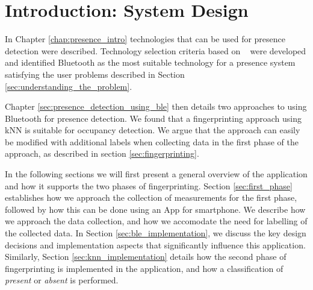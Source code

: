\section{Introduction: System Design}
In Chapter \ref{chap:presence_intro} technologies that can be used for presence detection were described. 
Technology selection criteria based on \citeauthor{presence_ble_review}~\cite{presence_ble_review} were developed and identified Bluetooth as the most suitable technology for a presence system satisfying the user problems described in Section \ref{sec:understanding_the_problem}.

Chapter \ref{sec:presence_detection_using_ble} then details two approaches to using Bluetooth for presence detection. 
We found that a fingerprinting approach using kNN is suitable for occupancy detection. 
We argue that the approach can easily be modified with additional labels when collecting data in the first phase of the approach, as described in section \ref{sec:fingerprinting}.

In the following sections we will first present a general overview of the application and how it supports the two phases of fingerprinting. 
Section \ref{sec:first_phase} establishes how we approach the collection of measurements for the first phase, followed by how this can be done using an App for smartphone. 
We describe how we approach the data collection, and how we accomodate the need for labelling of the collected data.
In Section \ref{sec:ble_implementation}, we discuss the key design decisions and implementation aspects that significantly influence this application.
Similarly, Section \ref{sec:knn_implementation} details how the second phase of fingerprinting is implemented in the application, and how a classification of \textit{present} or \textit{absent} is performed.



